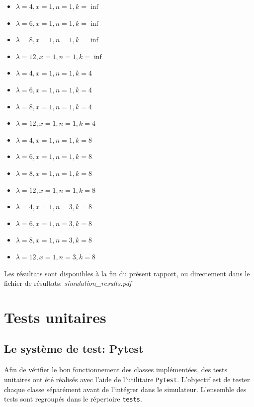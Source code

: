 \documentclass[11pt,a4paper]{article}
\begin{document}
\begin{itemize}
    \item $\lambda=4, x=1, n=1, k=\inf$
    \item $\lambda=6, x=1, n=1, k=\inf$
    \item $\lambda=8, x=1, n=1, k=\inf$
    \item $\lambda=12, x=1, n=1, k=\inf$
\end{itemize}
\begin{itemize}
    \item $\lambda=4, x=1, n=1, k=4$
    \item $\lambda=6, x=1, n=1, k=4$
    \item $\lambda=8, x=1, n=1, k=4$
    \item $\lambda=12, x=1, n=1, k=4$
\end{itemize}
\begin{itemize}
    \item $\lambda=4, x=1, n=1, k=8$
    \item $\lambda=6, x=1, n=1, k=8$
    \item $\lambda=8, x=1, n=1, k=8$
    \item $\lambda=12, x=1, n=1, k=8$
\end{itemize}
\begin{itemize}
    \item $\lambda=4, x=1, n=3, k=8$
    \item $\lambda=6, x=1, n=3, k=8$
    \item $\lambda=8, x=1, n=3, k=8$
    \item $\lambda=12, x=1, n=3, k=8$
\end{itemize}


Les résultats sont disponibles à la fin du présent rapport, ou directement dans le fichier de résultats: \emph{simulation\_results.pdf}

\bigskip
\bigskip
\bigskip

\section{Tests unitaires}
\subsection{Le système de test: Pytest}
Afin de vérifier le bon fonctionnement des classes implémentées, des tests unitaires ont été réalisés avec l'aide de l'utilitaire \lstinline|Pytest|. L'objectif est de tester chaque classe séparément avant de l'intégrer dans le simulateur. L'ensemble des tests sont regroupés dans le répertoire \lstinline|tests|.
\end{document}
